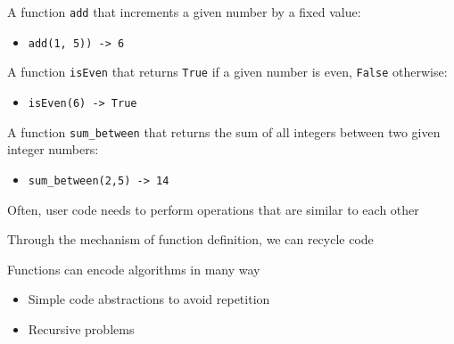\documentclass{beamer}
\begin{document}
\begin{slide}{
\item A function \texttt{add} that increments a given number by a fixed value:
\begin{itemize}
\item \texttt{add(1, 5)) -> 6}
\end{itemize}
\item A function \texttt{isEven} that returns \texttt{True} if a given number is even, \texttt{False} otherwise:
\begin{itemize}
\item \texttt{isEven(6) -> True}
\end{itemize}
\item A function \texttt{sum\_between} that returns the sum of all integers between two given integer numbers:
\begin{itemize}
\item \texttt{sum\_between(2,5) -> 14}
\end{itemize}
}\end{slide}

\begin{slide}{
\item Often, user code needs to perform operations that are similar to each other
\item Through the mechanism of function definition, we can recycle code
\item Functions can encode algorithms in many way
\begin{itemize}
\item Simple code abstractions to avoid repetition
\item Recursive problems
\end{itemize}
}\end{slide}

\begin{thankyou}
\end{thankyou}
\end{document}
